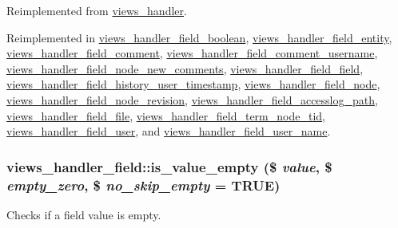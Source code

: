 Reimplemented from \hyperlink{classviews__handler_aa7df174ffa94ab095f7b9fdf154bcc30}{views\_\-handler}.

Reimplemented in \hyperlink{classviews__handler__field__boolean_aaf7acd5dcd7831d32a3977f5211230fb}{views\_\-handler\_\-field\_\-boolean}, \hyperlink{classviews__handler__field__entity_abf4b21db5fffaa1ddfdaca4896a40832}{views\_\-handler\_\-field\_\-entity}, \hyperlink{classviews__handler__field__comment_a284d26dff5d2ddba3a2f692bf375d770}{views\_\-handler\_\-field\_\-comment}, \hyperlink{classviews__handler__field__comment__username_a675e72d8f097a5d645459fab6943bac6}{views\_\-handler\_\-field\_\-comment\_\-username}, \hyperlink{classviews__handler__field__node__new__comments_aef91916aec8e7a7c77ea1c9079de19b6}{views\_\-handler\_\-field\_\-node\_\-new\_\-comments}, \hyperlink{classviews__handler__field__field_ad700213e1c6ed422441db57cf58f47c6}{views\_\-handler\_\-field\_\-field}, \hyperlink{classviews__handler__field__history__user__timestamp_addc2c91173eae704e1283e726c6f15d0}{views\_\-handler\_\-field\_\-history\_\-user\_\-timestamp}, \hyperlink{classviews__handler__field__node_a4f263bde5682e4c2285a0e51a7f8b472}{views\_\-handler\_\-field\_\-node}, \hyperlink{classviews__handler__field__node__revision_aa89b3130f87bc8811d777a29f8e4468c}{views\_\-handler\_\-field\_\-node\_\-revision}, \hyperlink{classviews__handler__field__accesslog__path_a9f0e65ae8a7fbc2ef5986c3519da67b2}{views\_\-handler\_\-field\_\-accesslog\_\-path}, \hyperlink{classviews__handler__field__file_aa0c76118aaf12d0938111d093411c016}{views\_\-handler\_\-field\_\-file}, \hyperlink{classviews__handler__field__term__node__tid_ac3c22862ed731d0fc71d56ba9308d120}{views\_\-handler\_\-field\_\-term\_\-node\_\-tid}, \hyperlink{classviews__handler__field__user_a94156733dfddeb57dbd856e0f574cde6}{views\_\-handler\_\-field\_\-user}, and \hyperlink{classviews__handler__field__user__name_a5879bbaa4a1e59f9509b9a5d6fbdd9b2}{views\_\-handler\_\-field\_\-user\_\-name}.\hypertarget{classviews__handler__field_aedcf5c58af2c99eb8363cfd63c1f86e7}{
\subsubsection[{is\_\-value\_\-empty}]{\setlength{\rightskip}{0pt plus 5cm}views\_\-handler\_\-field::is\_\-value\_\-empty (\$ {\em value}, \/  \$ {\em empty\_\-zero}, \/  \$ {\em no\_\-skip\_\-empty} = {\ttfamily TRUE})}}
\label{classviews__handler__field_aedcf5c58af2c99eb8363cfd63c1f86e7}
Checks if a field value is empty.


